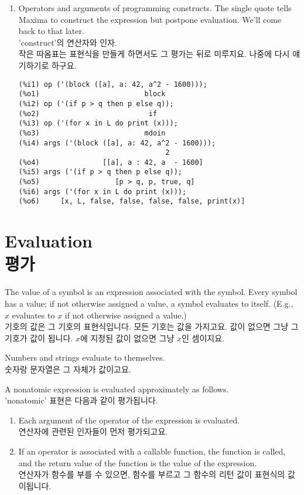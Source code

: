 \documentclass[12pt]{article}
\begin{document}
\begin{enumerate}
\item Operators and arguments of programming constructs.
The single quote tells Maxima to construct the expression but postpone evaluation.
We'll come back to that later. \\
'construct'의 연산자와 인자. \\
작은 따옴표는 표현식을 만들게 하면서도 그 평가는 뒤로 미루지요. 나중에 다시 얘기하기로 하구요.

\begin{verbatim}
(%i1) op ('(block ([a], a: 42, a^2 - 1600)));
(%o1)                         block
(%i2) op ('(if p > q then p else q));
(%o2)                          if
(%i3) op ('(for x in L do print (x)));
(%o3)                         mdoin
(%i4) args ('(block ([a], a: 42, a^2 - 1600)));
                                   2
(%o4)               [[a], a : 42, a  - 1600]
(%i5) args ('(if p > q then p else q));
(%o5)                  [p > q, p, true, q]
(%i6) args ('(for x in L do print (x)));
(%o6)     [x, L, false, false, false, false, print(x)]
\end{verbatim}

\end{enumerate}

\section{Evaluation \\ 평가}

The value of a symbol is an expression associated with the symbol.
Every symbol has a value;
if not otherwise assigned a value, a symbol evaluates to itself.
(E.g., $x$ evaluates to $x$ if not otherwise assigned a value.) \\

기호의 값은 그 기호의 표현식입니다. 모든 기호는 값을 가지고요.
값이 없으면 그냥 그 기호가 값이 됩니다. $x$에 지정된 값이 없으면 그냥 $x$인 셈이지요.

Numbers and strings evaluate to themselves. \\
숫자랑 문자열은 그 자체가 값이고요.

A nonatomic expression is evaluated approximately as follows. \\
'nonatomic' 표현은 다음과 같이 평가됩니다.

\begin{enumerate}
\item Each argument of the operator of the expression is evaluated. \\
연산자에 관련된 인자들이 먼저 평가되고요.
\item If an operator is associated with a callable function, the function is called,
and the return value of the function is the value of the expression. \\
연산자가 함수를 부를 수 있으면, 함수를 부르고 그 함수의 리턴 값이 표현식의 값이됩니다.
\end{enumerate}
\end{document}
